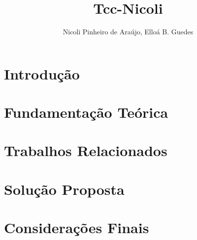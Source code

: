 \documentclass[12pt]{article}
\title{Tcc-Nicoli}
\author{Nicoli Pinheiro de Araújo, Elloá B. Guedes}
\begin{document}

\maketitle



\section{Introdução}\label{sec:intro}


\section{Fundamentação Teórica}\label{sec:fund_teorica}


\section{Trabalhos Relacionados}\label{sec:trab_relac}


\section{Solução Proposta}\label{sec:solucao_proposta}


\section{Considerações Finais}\label{sec:consid_finais}




\end{document}
